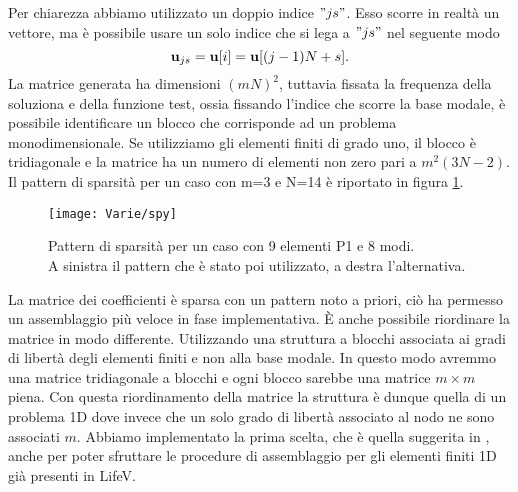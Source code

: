 Per chiarezza abbiamo utilizzato un doppio indice $"js"$. Esso scorre in realt\`a  un vettore,
ma \`e possibile usare un solo indice che si lega a $"js"$ nel seguente modo
$$\mathbf{u}_{js}=\mathbf{u}[i]=\mathbf{u}[(j-1)N+s].$$ 
 La matrice generata ha dimensioni $(mN)^2$, tuttavia fissata
 la frequenza della soluziona e della funzione test, ossia fissando l'indice che scorre la base modale,
 \`e possibile identificare un blocco che corrisponde ad un problema monodimensionale.
Se utilizziamo gli elementi finiti di grado uno, il blocco \`e tridiagonale e
 la matrice ha un numero di elementi non zero pari a $m^2(3N-2)$. 
 Il pattern di sparsit\`a per un caso con m=3 e N=14 \`e riportato in figura \ref{fig:pattern}.
 \begin{figure}[!h]
    \centering
    \texttt{[image: Varie/spy]}
    \caption{Pattern di sparsit\`a per un caso con 9 elementi P1 e 8 modi.\\A sinistra il pattern che \`e stato poi utilizzato, a destra l'alternativa.}
    \label{fig:pattern}
\end{figure}
La matrice dei coefficienti \`e sparsa con un pattern noto a priori, ci\`o ha permesso 
 un assemblaggio pi\`u veloce in fase implementativa.
 \`E anche possibile riordinare la matrice in modo differente. Utilizzando una struttura 
 a blocchi associata ai gradi di libert\`a degli elementi finiti e non alla base modale.
 In questo modo avremmo una matrice tridiagonale a blocchi e ogni blocco sarebbe una matrice
 $m\times m$ piena. Con questa riordinamento della matrice la struttura \`e dunque quella 
 di un problema 1D dove invece che un solo grado di libert\`a associato al nodo ne sono associati $m$.
 Abbiamo implementato la prima scelta, che \`e quella suggerita in
 \cite{paperseriohimod}, anche per poter sfruttare le procedure di assemblaggio 
 per gli elementi finiti 1D gi\`a presenti in LifeV.
\clearpage




